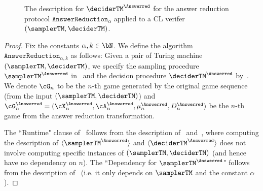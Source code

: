 \begin{figure}[!htbp]
\begin{gamespec}
	\end{gamespec}
		\caption{The description for $\deciderTM^{\Answerred}$ for the answer reduction protocol $\texttt{AnswerReduction}_{\alpha}$ applied to a CL verifer $(\samplerTM, \deciderTM)$. }
	\label{fig:Answerredver}
\end{figure}
\begin{proof} 

Fix the constants $\alpha,k \in \bN$. We define the algorithm $\texttt{AnswerReduction}_{\alpha, k}$ as follows: Given a pair of Turing machine $(\samplerTM, \deciderTM)$, we specify the sampling procedure $\samplerTM^{\Answerred}$ in~ and the decision procedure $\deciderTM^{\Answerred}$ by~. We denote $\cG_n$ to be the $n$-th game generated by the original game sequence (from the input $(\samplerTM, \deciderTM)$) and $\cG_n^{\Answerred} = (\cX_n^{\Answerred}, \cA_n^{\Answerred}, \mu_n^{\Answerred}, D_n^{\Answerred})$ be the $n$-th game from the answer reduction transformation. 


The ``Runtime"  clause of~ follows from the description of~ and~, where computing the description of $\langle\samplerTM^{\Answerred} \rangle$ and  $\langle\deciderTM^{\Answerred} \rangle$ does not involve computing specific instances of $(\samplerTM, \deciderTM)$ (and hence have no dependency on $n$). The ``Dependency for $\samplerTM^{\Answerred}$" follows from the description of~ (i.e. it only depends on $\samplerTM$ and the constant $\alpha$). 


\end{proof}
